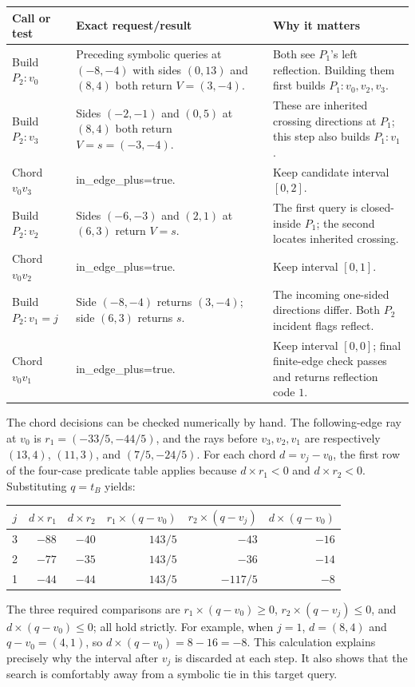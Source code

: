 \documentclass[12pt,a4paper]{article}
\newcommand{\cross}{\mathbin{\times}}
\newcommand{\code}[1]{{\ttfamily\color{codekw}#1}}
\begin{document}
\begin{center}\small
\begin{tabular}{@{}p{22mm}p{59mm}p{67mm}@{}}\toprule
Call or test&Exact request/result&Why it matters\\\midrule
Build \(P_2:v_0\)&Preceding symbolic queries at \((-8,-4)\) with sides \((0,13)\) and \((8,4)\) both return \(V=(3,-4)\).&Both see \(P_1\)'s left reflection. Building them first builds \(P_1:v_0,v_2,v_3\).\\
Build \(P_2:v_3\)&Sides \((-2,-1)\) and \((0,5)\) at \((8,4)\) both return \(V=s=(-3,-4)\).&These are inherited crossing directions at \(P_1\); this step also builds \(P_1:v_1\).\\
Chord \(v_0v_3\)&\code{in\_edge\_plus}=true.&Keep candidate interval \([0,2]\).\\
Build \(P_2:v_2\)&Sides \((-6,-3)\) and \((2,1)\) at \((6,3)\) return \(V=s\).&The first query is closed-inside \(P_1\); the second locates inherited crossing.\\
Chord \(v_0v_2\)&\code{in\_edge\_plus}=true.&Keep interval \([0,1]\).\\
Build \(P_2:v_1=j\)&Side \((-8,-4)\) returns \((3,-4)\); side \((6,3)\) returns \(s\).&The incoming one-sided directions differ. Both \(P_2\) incident flags reflect.\\
Chord \(v_0v_1\)&\code{in\_edge\_plus}=true.&Keep interval \([0,0]\); final finite-edge check passes and returns reflection code \(1\).\\\bottomrule
\end{tabular}
\end{center}

The chord decisions can be checked numerically by hand. The following-edge ray at \(v_0\) is \(r_1=(-33/5,-44/5)\), and the rays before \(v_3,v_2,v_1\) are respectively \((13,4)\), \((11,3)\), and \((7/5,-24/5)\). For each chord \(d=v_j-v_0\), the first row of the four-case predicate table applies because \(d\cross r_1<0\) and \(d\cross r_2<0\). Substituting \(q=t_B\) yields:
\begin{center}\small
\begin{tabular}{@{}c r r r r r@{}}\toprule
\(j\)&\(d\cross r_1\)&\(d\cross r_2\)&\(r_1\cross(q-v_0)\)&\(r_2\cross(q-v_j)\)&\(d\cross(q-v_0)\)\\\midrule
3&\(-88\)&\(-40\)&\(143/5\)&\(-43\)&\(-16\)\\
2&\(-77\)&\(-35\)&\(143/5\)&\(-36\)&\(-14\)\\
1&\(-44\)&\(-44\)&\(143/5\)&\(-117/5\)&\(-8\)\\\bottomrule
\end{tabular}
\end{center}
The three required comparisons are \(r_1\cross(q-v_0)\ge0\), \(r_2\cross(q-v_j)\le0\), and \(d\cross(q-v_0)\le0\); all hold strictly. For example, when \(j=1\), \(d=(8,4)\) and \(q-v_0=(4,1)\), so \(d\cross(q-v_0)=8-16=-8\). This calculation explains precisely why the interval after \(v_j\) is discarded at each step. It also shows that the search is comfortably away from a symbolic tie in this target query.
\end{document}
